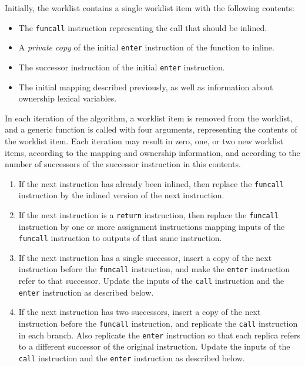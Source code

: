 Initially, the worklist contains a single worklist item with the
following contents:

\begin{itemize}
\item The \texttt{funcall} instruction representing the call that
  should be inlined.
\item A \emph{private copy} of the initial \texttt{enter} instruction
  of the function to inline.
\item The successor instruction of the initial \texttt{enter}
  instruction.
\item The initial mapping described previously, as well as
  information about ownership lexical variables.
\end{itemize}

In each iteration of the algorithm, a worklist item is removed from
the worklist, and a generic function is called with four arguments,
representing the contents of the worklist item.  Each iteration may
result in zero, one, or two new worklist items, according to the
mapping and ownership information, and according to the number of
successors of the successor instruction in this contents.

\begin{enumerate}
\item If the next instruction has already been inlined, then replace
  the \texttt{funcall} instruction by the inlined version of the next
  instruction.
\item If the next instruction is a \texttt{return} instruction, then
  replace the \texttt{funcall} instruction by one or more assignment
  instructions mapping inputs of the \texttt{funcall} instruction to
  outputs of that same instruction.
\item If the next instruction has a single successor, insert a copy of
  the next instruction before the \texttt{funcall} instruction, and
  make the \texttt{enter} instruction refer to that successor.  Update
  the inputs of the \texttt{call} instruction and the \texttt{enter}
  instruction as described below.
\item If the next instruction has two successors, insert a copy of the
  next instruction before the \texttt{funcall} instruction, and
  replicate the \texttt{call} instruction in each branch.  Also
  replicate the \texttt{enter} instruction so that each replica refers
  to a different successor of the original instruction.  Update the
  inputs of the \texttt{call} instruction and the \texttt{enter}
  instruction as described below.
\end{enumerate}

